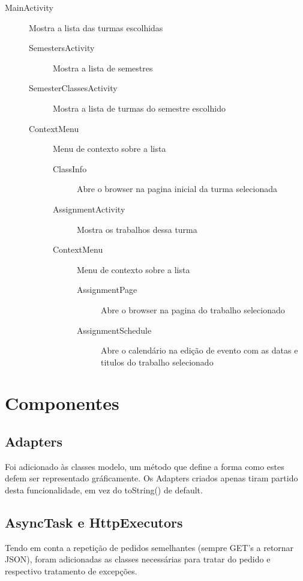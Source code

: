\documentclass{article}
\begin{document}
\begin{description}
	\item[MainActivity] Mostra a lista das turmas escolhidas
		\begin{description}
			\item[SemestersActivity] Mostra a lista de semestres
			\item[SemesterClassesActivity] Mostra a lista de turmas do semestre escolhido
			\item[ContextMenu] Menu de contexto sobre a lista
			\begin{description}			
				\item[ClassInfo] Abre o browser na pagina inicial da turma selecionada
				\item[AssignmentActivity] Mostra os trabalhos dessa turma
				\item[ContextMenu] Menu de contexto sobre a lista
				\begin{description}											
					\item[AssignmentPage] Abre o browser na pagina do trabalho selecionado
					\item[AssignmentSchedule] Abre o calendário na edição de evento com as datas e titulos do trabalho selecionado
				\end{description}
			\end{description}
		\end{description}
\end{description}
					

\section{Componentes}

\subsection{Adapters}
Foi adicionado às classes modelo, um método que define a forma como estes defem ser representado gráficamente. Os Adapters criados apenas tiram partido desta funcionalidade, em vez do toString() de default.

\subsection{AsyncTask e HttpExecutors}
Tendo em conta a repetição de pedidos semelhantes (sempre GET's a retornar JSON), foram adicionadas as classes necessárias para tratar do pedido e respectivo tratamento de excepções.
\end{document}
